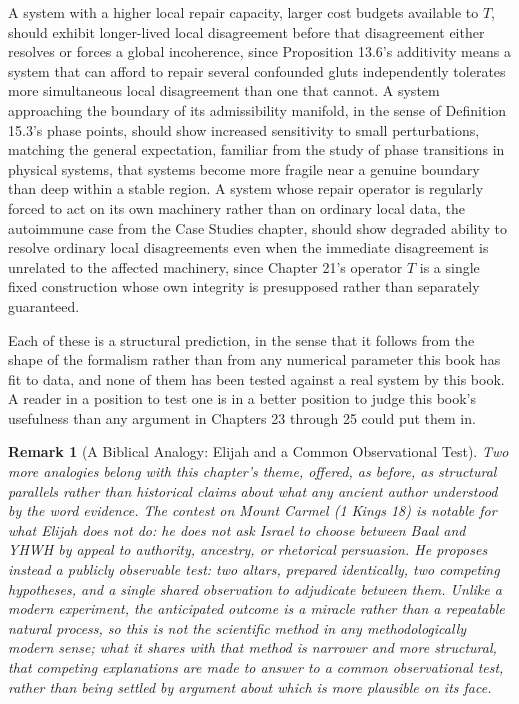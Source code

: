 \documentclass[11pt]{book}
\newtheorem*{appendixremark}{Remark}
\begin{document}
A system with a higher local repair capacity, larger cost budgets available to $T$, should exhibit longer-lived local disagreement before that disagreement either resolves or forces a global incoherence, since Proposition 13.6's additivity means a system that can afford to repair several confounded gluts independently tolerates more simultaneous local disagreement than one that cannot. A system approaching the boundary of its admissibility manifold, in the sense of Definition 15.3's phase points, should show increased sensitivity to small perturbations, matching the general expectation, familiar from the study of phase transitions in physical systems, that systems become more fragile near a genuine boundary than deep within a stable region. A system whose repair operator is regularly forced to act on its own machinery rather than on ordinary local data, the autoimmune case from the Case Studies chapter, should show degraded ability to resolve ordinary local disagreements even when the immediate disagreement is unrelated to the affected machinery, since Chapter 21's operator $T$ is a single fixed construction whose own integrity is presupposed rather than separately guaranteed.

Each of these is a structural prediction, in the sense that it follows from the shape of the formalism rather than from any numerical parameter this book has fit to data, and none of them has been tested against a real system by this book. A reader in a position to test one is in a better position to judge this book's usefulness than any argument in Chapters 23 through 25 could put them in.

\begin{appendixremark}[A Biblical Analogy: Elijah and a Common Observational Test]
Two more analogies belong with this chapter's theme, offered, as before, as structural parallels rather than historical claims about what any ancient author understood by the word evidence. The contest on Mount Carmel (1 Kings 18) is notable for what Elijah does not do: he does not ask Israel to choose between Baal and YHWH by appeal to authority, ancestry, or rhetorical persuasion. He proposes instead a publicly observable test: two altars, prepared identically, two competing hypotheses, and a single shared observation to adjudicate between them. Unlike a modern experiment, the anticipated outcome is a miracle rather than a repeatable natural process, so this is not the scientific method in any methodologically modern sense; what it shares with that method is narrower and more structural, that competing explanations are made to answer to a common observational test, rather than being settled by argument about which is more plausible on its face.
\end{appendixremark}
\end{document}
